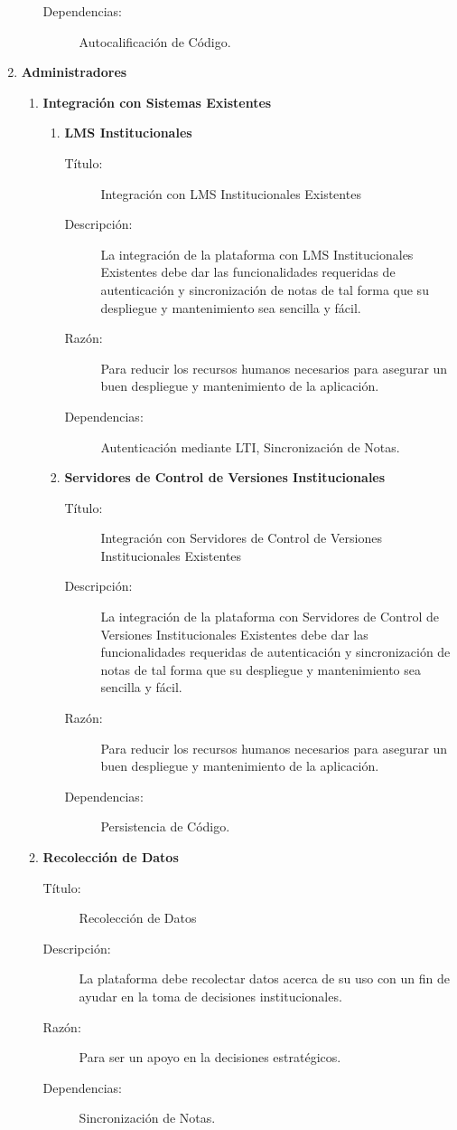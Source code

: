 \begin{enumerate}
\begin{enumerate}
\begin{description}
			\item[Dependencias:] Autocalificación de Código.
        \end{description}
    \end{enumerate}
    \item \textbf{Administradores}
    \begin{enumerate}
    	\item \textbf{Integración con Sistemas Existentes}
        \begin{enumerate}
			\item \textbf{LMS Institucionales}
	        \begin{description}
				\item[Título:] Integración con LMS Institucionales Existentes
				\item[Descripción:] La integración de la plataforma con LMS Institucionales Existentes debe dar las funcionalidades requeridas de autenticación y sincronización de notas de tal forma que su despliegue y mantenimiento sea sencilla y fácil.
				\item[Razón:] Para reducir los recursos humanos necesarios para asegurar un buen despliegue y mantenimiento de la aplicación.
				\item[Dependencias:] Autenticación mediante LTI, Sincronización de Notas.
	        \end{description}
			\item \textbf{Servidores de Control de Versiones Institucionales}
	        \begin{description}
				\item[Título:] Integración con Servidores de Control de Versiones Institucionales Existentes
				\item[Descripción:] La integración de la plataforma con Servidores de Control de Versiones Institucionales Existentes debe dar las funcionalidades requeridas de autenticación y sincronización de notas de tal forma que su despliegue y mantenimiento sea sencilla y fácil.
				\item[Razón:] Para reducir los recursos humanos necesarios para asegurar un buen despliegue y mantenimiento de la aplicación.
				\item[Dependencias:] Persistencia de Código.
	        \end{description}
        \end{enumerate}
    	\item \textbf{Recolección de Datos}
	    \begin{description}
			\item[Título:] Recolección de Datos
			\item[Descripción:] La plataforma debe recolectar datos acerca de su uso con un fin de ayudar en la toma de decisiones institucionales.
			\item[Razón:] Para ser un apoyo en la decisiones estratégicos.
			\item[Dependencias:] Sincronización de Notas.
	    \end{description}
    \end{enumerate}
\end{enumerate}

